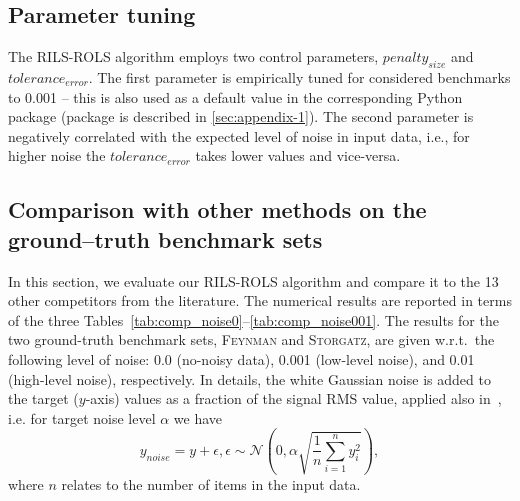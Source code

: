 \documentclass{bmcart}
\begin{document}
\subsection{Parameter tuning}
The \textsc{RILS}-\textsc{ROLS} algorithm employs two control parameters, $penalty_{size}$ and $tolerance_{error}$. The first parameter is empirically tuned for considered benchmarks to 0.001 -- this is also used as a default value in the corresponding Python package (package is described in \ref{sec:appendix-1}). The second parameter is negatively correlated with the expected level of noise in input data, i.e., for higher noise the $tolerance_{error}$ takes lower values and vice-versa.



\subsection{Comparison with other methods on the   ground--truth benchmark sets}
In this section, we evaluate our \textsc{RILS-ROLS} algorithm and compare it to the 13 other competitors from the literature. The numerical results are reported in terms of the three Tables~\ref{tab:comp_noise0}--\ref{tab:comp_noise001}. The results for the two ground-truth benchmark sets, \textsc{Feynman} and \textsc{Storgatz}, are given w.r.t.\   the following level of noise: 0.0 (no-noisy data), 0.001 (low-level noise), and 0.01 (high-level noise), respectively. In details, the white Gaussian noise is added to the target ($y$-axis) values as a fraction of the signal RMS value, applied also in~\cite{la2021contemporary}, i.e. for target noise level $\alpha$ we have
$$ y_{noise} = y + \epsilon, \epsilon \sim \mathcal{N}\left(0, \alpha \sqrt{\frac{1}{n} \sum _{i=1}^n{y_i^2}}\right),$$
where $n$ relates to the number of items in the input data.
\end{document}
